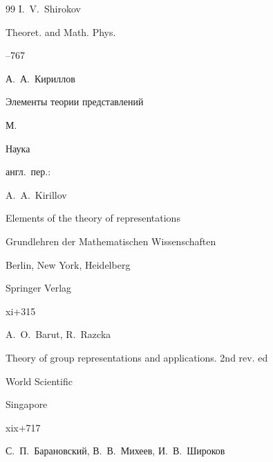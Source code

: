 \begin{thebibliography}{99}
\by I.~V.~Shirokov

\jour Theoret. and Math. Phys.




--767














\by А.~А.~Кириллов 

\book Элементы теории представлений

\publaddr М.

\publ Наука 



\transl \mbox{англ. пер.}:  {} 

\by A.~A.~Kirillov

\book Elements of the theory of representations

\serial Grundlehren der Mathematischen Wissenschaften


\publaddr Berlin, New York, Heidelberg

\publ Springer Verlag


\totalpages xi+315






\by A.~O.~Barut, R.~Razcka

\book Theory of group representations and applications. 2nd rev. ed

\publ World Scientific

\publaddr Singapore


\totalpages xix+717






\by С.~П.~Барановский, В.~В.~Михеев, И.~В.~Широков


\end{thebibliography}
